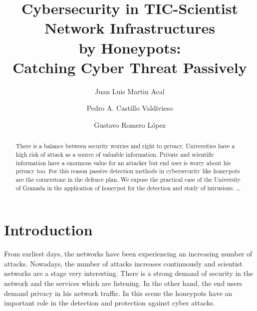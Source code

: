 \documentclass[a4paper]{llncs}
\begin{document}
\pagestyle{empty}

\mainmatter

\title{Cybersecurity in TIC-Scientist Network Infrastructures\\by Honeypots:\\Catching Cyber Threat Passively}


\author{Juan Luis Martin Acal \and Pedro A. Castillo Valdivieso
\and Gustavo Romero López}



\maketitle

\begin{abstract}
There is a balance between security worries and right to privacy. Universities have a high risk of attack as a source of valuable information. Private and scientific information have a enormous value for an attacker but end user is worry about his privacy too. For this reason passive detection methods in cybersecurity like honeypots are the cornerstone in the defence plan. We expose the practical case of the University of Granada in the application of honeypot for the detection and study of intrusions.
\dots
\end{abstract}


\section{Introduction}

From earliest days, the networks have been experiencing an increasing number of attacks. Nowadays, the number of attacks increases continuously and scientist networks are a stage very interesting. There is a strong demand of security in the network and the services which are listening. In the other hand, the end users demand privacy in his network traffic. In this scene the honeypots have an important role in the detection and protection against cyber attacks.
\end{document}
